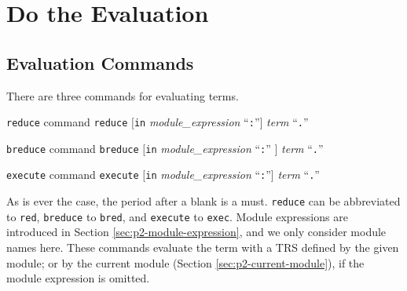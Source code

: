 \documentclass[a4paper]{memoir}
\begin{document}
\section{Do the Evaluation}

\subsection{Evaluation Commands}\label{sec:p2-evaluation-command}

There are three commands for evaluating terms.

\begin{bsyntax} \texttt{reduce} command  \Hline
\texttt{reduce} $[$\texttt{in} \textit{module\_expression} ``\texttt{:}''$]$ \textit{term} ``\texttt{.}''
\end{bsyntax}

\begin{bsyntax} \texttt{breduce} command  \Hline
\texttt{breduce} $[$\texttt{in} \textit{module\_expression} ``\texttt{:}'' $]$ \textit{term} ``\texttt{.}''
\end{bsyntax}

\begin{bsyntax} \texttt{execute} command  \Hline
\texttt{execute} $[$\texttt{in} \textit{module\_expression} ``\texttt{:}''$]$ \textit{term} ``\texttt{.}''
\end{bsyntax}

As is ever the case, the period after a blank is a must.
\verb|reduce| can be abbreviated to \verb|red|, \verb|breduce| to
\verb|bred|, and
\verb|execute| to \verb|exec|. Module expressions are introduced in
Section \ref{sec:p2-module-expression}, and we only consider
module names here. These commands evaluate the term with a TRS defined
by the given module; or by the current module
(Section \ref{sec:p2-current-module}),
if the module expression is omitted.
\end{document}
